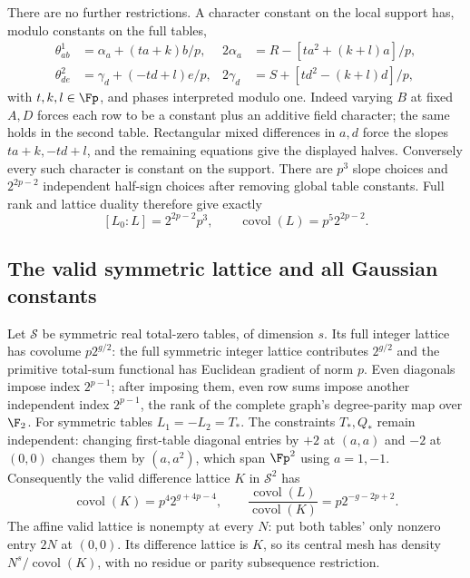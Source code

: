 There are no further restrictions. A character constant on the
local support has, modulo constants on the full tables,
\begin{align*}
 \theta^1_{ab}&=\alpha_a+(ta+k)b/p,&
 2\alpha_a&=R-[ta^2+(k+l)a]/p,\\
 \theta^2_{de}&=\gamma_d+(-td+l)e/p,&
 2\gamma_d&=S+[td^2-(k+l)d]/p,
\end{align*}
with $t,k,l\in\Fp$, and phases interpreted modulo one.
Indeed varying $B$ at fixed $A,D$ forces each row to be a constant
plus an additive field character; the same holds in the second
table. Rectangular mixed differences in $a,d$ force the slopes
$ta+k,-td+l$, and the remaining equations give the displayed halves.
Conversely every such character is constant on the support.
There are $p^3$ slope choices and $2^{2p-2}$ independent half-sign
choices after removing global table constants. Full rank and lattice
duality therefore give exactly
\begin{equation}\label{eq:cubic-L}
 [L_0:L]=2^{2p-2}p^3,\qquad\operatorname{covol}(L)=p^5 2^{2p-2}.
\end{equation}

\subsection{The valid symmetric lattice and all Gaussian constants}
Let $\mathcal S$ be symmetric real total-zero tables, of dimension
$s$. Its full integer lattice has covolume $p2^{g/2}$: the full
symmetric integer lattice contributes $2^{g/2}$ and the primitive
total-sum functional has Euclidean gradient of norm $p$.
Even diagonals impose index $2^{p-1}$; after imposing them, even
row sums impose another independent index $2^{p-1}$, the rank of
the complete graph's degree-parity map over $\F_2$.
For symmetric tables $L_1=-L_2=T_*$. The constraints $T_*,Q_*$
remain independent: changing first-table diagonal entries by $+2$
at $(a,a)$ and $-2$ at $(0,0)$ changes them by $(a,a^2)$, which
span $\Fp^2$ using $a=1,-1$.
Consequently the valid difference lattice $K$ in $\mathcal S^2$ has
\begin{equation}\label{eq:cubic-K}
 \operatorname{covol}(K)=p^4 2^{g+4p-4},\qquad
 \frac{\operatorname{covol}(L)}{\operatorname{covol}(K)}
       =p2^{-g-2p+2}.
\end{equation}
The affine valid lattice is nonempty at every $N$: put both tables'
only nonzero entry $2N$ at $(0,0)$. Its difference lattice is $K$,
so its central mesh has density $N^s/\operatorname{covol}(K)$,
with no residue or parity subsequence restriction.

